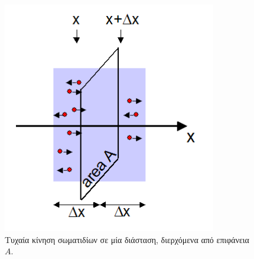 \begin{figure}[h]
    \centering
    \includegraphics[scale=0.7]{Figures/ficks_diffusion_law.png}
    \caption{Τυχαία κίνηση σωματιδίων σε μία διάσταση, διερχόμενα από επιφάνεια $A$.}
    \label{fig:ficks_diffusion_law}
\end{figure}


